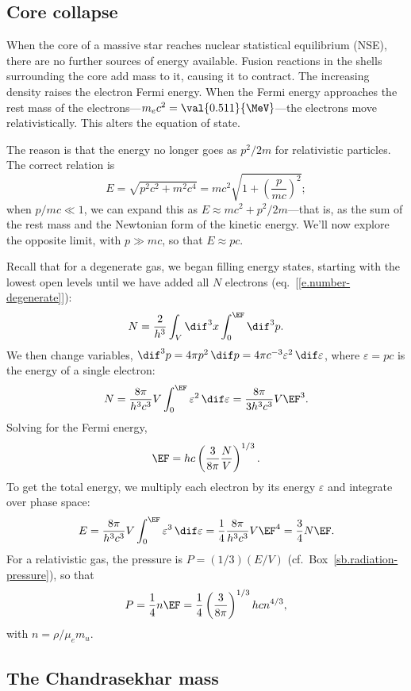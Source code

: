 \subsection{Core collapse}
When the core of a massive star reaches nuclear statistical equilibrium (NSE), there are no further sources of energy available. Fusion reactions in the shells surrounding the core add mass to it, causing it to contract. The increasing density raises the electron Fermi energy. When the Fermi energy approaches the rest mass of the electrons---$m_{e}c^{2} = \val{0.511}{\MeV}$---the electrons move relativistically. This alters the equation of state.

The reason is that the energy no longer goes as $p^{2}/2m$ for relativistic particles. The correct relation is
\[
	E = \sqrt{p^{2}c^{2} + m^{2}c^{4}} = mc^{2}\sqrt{1 + \left(\frac{p}{mc}\right)^{2}};
\]
when $p/mc\ll 1$, we can expand this as $E\approx m c^{2} + p^{2}/2m$---that is, as the sum of the rest mass and the Newtonian form of the kinetic energy. We'll now explore the opposite limit, with $p \gg mc$, so that $E \approx pc$.

Recall that for a degenerate gas, we began filling energy states, starting with the lowest open levels until we have added all $N$ electrons (eq.~[\ref{e.number-degenerate}]):
\[
	N = \frac{2}{h^{3}}\int_{V}\dif^{3}x\int_{0}^{\EF}\dif^{3}p.
\]
We then change variables, $\dif^{3}p = 4\pi p^{2}\,\dif p = 4\pi c^{-3}\varepsilon^{2}\,\dif\varepsilon$, where $\varepsilon = pc$ is the energy of a single electron:
\[
	N = \frac{8\pi}{h^{3}c^{3}}V \int_{0}^{\EF} \varepsilon^{2}\,\dif\varepsilon
	= \frac{8\pi}{3h^{3}c^{3}} V  \EF^{3}.
\]
Solving for the Fermi energy,
\[
	\EF = hc\left(\frac{3}{8\pi}\frac{N}{V}\right)^{1/3}.
\]
To get the total energy, we multiply each electron by its energy $\varepsilon$ and integrate over phase space:
\[
	E = \frac{8\pi}{h^{3}c^{3}}V\int_{0}^{\EF}\varepsilon^{3}\,\dif\varepsilon = 
		\frac{1}{4}\frac{8\pi}{h^{3}c^{3}}V\EF^{4} = \frac{3}{4}N\EF.
\]
For a relativistic gas, the pressure is $P = (1/3)(E/V)$ (cf.\ Box~\ref{sb.radiation-pressure}), so that
\begin{equation}
\label{e.pressure-relativistic}
	P = \frac{1}{4}n\EF = \frac{1}{4}\left(\frac{3}{8\pi}\right)^{1/3}hc n^{4/3},
\end{equation}
with $n = \rho/\mu_{e}m_{u}$.

\subsection{The Chandrasekhar mass}

